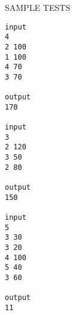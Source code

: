 SAMPLE TESTS
\begin{verbatim}
input
4
2 100 
1 100 
4 70 
3 70 

output
170 

input
3 
2 120 
3 50 
2 80

output
150

input
5 
3 30 
3 20 
4 100 
5 40 
3 60 

output
11
\end{verbatim}